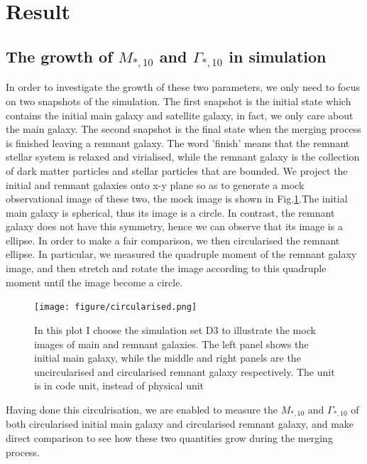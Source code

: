 \documentclass[fleqn,usenatbib]{mnras}
\begin{document}
\section{Result}
\subsection{The growth of $M_{*,10}$ and $\Gamma_{*,10}$ in simulation}
In order to investigate the growth of these two parameters, we only need to focus on two snapshots of the simulation. The first snapshot is the initial state which contains the initial main galaxy and satellite galaxy, in fact, we only care about the main galaxy. The second snapshot is the final state when the merging process is finished leaving a remnant galaxy. The word 'finish' means that the remnant stellar system is relaxed and virialised, while the remnant galaxy is the collection of dark matter particles and stellar particles that are bounded. We project the initial and remnant galaxies onto x-y plane so as to generate a mock observational image of these two, the mock image is shown in Fig.\ref{fig:mock_image}.The initial main galaxy is spherical, thus its image is a circle. In contrast, the remnant galaxy does not have this symmetry, hence we can observe that its image is a ellipse. In order to make a fair comparison, we then circularised the remnant ellipse. In particular, we measured the quadruple moment of the remnant galaxy image, and then stretch and rotate the image according to this quadruple moment until the image become a circle.
\begin{figure}
    \centering
    \texttt{[image: figure/circularised.png]}
    \caption{\label{fig:mock_image}In this plot I choose the simulation set D3 to illustrate the mock images of main and remnant galaxies. The left panel shows the  initial main galaxy, while the middle and right panels are  the uncircularised and circularised remnant galaxy respectively. The unit is in code unit, instead of physical unit}
\end{figure}
Having done this circulrisation, we are enabled to measure the $M_{*,10}$ and $\Gamma_{*,10}$ of both circularised initial main galaxy and circularised remnant galaxy, and make direct comparison to see how these two quantities grow during the merging process.
\end{document}
